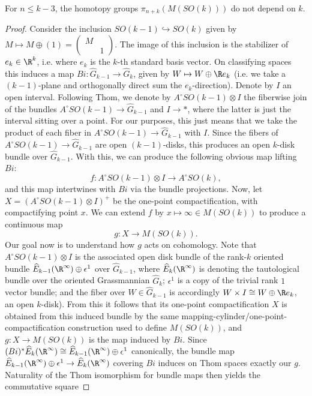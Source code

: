 \begin{theorem}
For $n\leq k-3$, the homotopy groups $\pi_{n+k}(M(SO(k)))$ do not depend on $k$.
\end{theorem}
\begin{proof}
    Consider the inclusion $SO(k-1)\hookrightarrow SO(k)$ given by $M\mapsto M\oplus (1)=\begin{pmatrix}
        M&\\&1
    \end{pmatrix}$. The image of this inclusion is the stabilizer of $e_k\in \R^k$, i.e. where $e_k$ is the $k$-th standard basis vector. On classifying spaces this induces a map $Bi:\widehat G_{k-1}\to \widehat G_k$, given by $W\mapsto W\oplus \R e_k$ (i.e. we take a $(k-1)$-plane and orthogonally direct sum the $e_k$-direction). Denote by $I$ an open interval. Following Thom, we denote by $A^\circ SO(k-1)\otimes I$ the fiberwise join of the bundles $A^\circ SO(k-1)\to \widehat G_{k-1}$ and $I\to *$, where the latter is just the interval sitting over a point. For our purposes, this just means that we take the product of each fiber in $A^\circ SO(k-1)\to \widehat G_{k-1}$ with $I$. Since the fibers of $A^\circ SO(k-1)\to \widehat G_{k-1}$ are open $(k-1)$-disks, this produces an open $k$-disk bundle over $\widehat G_{k-1}$. With this, we can produce the following obvious map lifting $Bi$:
    \[
        f:A^\circ SO(k-1)\otimes I\to A^\circ SO(k),
    \]
    and this map intertwines with $Bi$ via the bundle projections. Now, let $X=(A^\circ SO(k-1)\otimes I)^+$ be the one-point compactification, with compactifying point $x$. We can extend $f$ by $x\mapsto \infty\in M(SO(k))$ to produce a continuous map
    \[
        g:X\to M(SO(k)).
    \]
    Our goal now is to understand how $g$ acts on cohomology. Note that $A^\circ SO(k-1)\otimes I$ is the associated open disk bundle of the rank-$k$ oriented bundle $\widehat E_{k-1}(\R^\infty)\oplus\epsilon^1$ over $\widehat G_{k-1}$, where $\widehat E_{k}(\R^\infty)$ is denoting the tautological bundle over the oriented Grassmannian $\widehat G_k$; $\epsilon^1$ is a copy of the trivial rank $1$ vector bundle; and the fiber over $W\in\widehat G_{k-1}$ is accordingly $W\times I\cong W\oplus \R e_k$, an open $k$-disk). From this it follows that its one-point compactification $X$ is obtained from this induced bundle by the same mapping-cylinder/one-point-compactification construction used to define $M(SO(k))$, and $g:X\to M(SO(k))$ is the map induced by $Bi$. Since $(Bi)^*\widehat E_k(\R^\infty)\cong\widehat E_{k-1}(\R^\infty)\oplus\epsilon^1$ canonically, the bundle map $\widehat E_{k-1}(\R^\infty)\oplus\epsilon^1\to\widehat E_k(\R^\infty)$ covering $Bi$ induces on Thom spaces exactly our $g$. Naturality of the Thom isomorphism for bundle maps then yields the commutative square

\end{proof}
